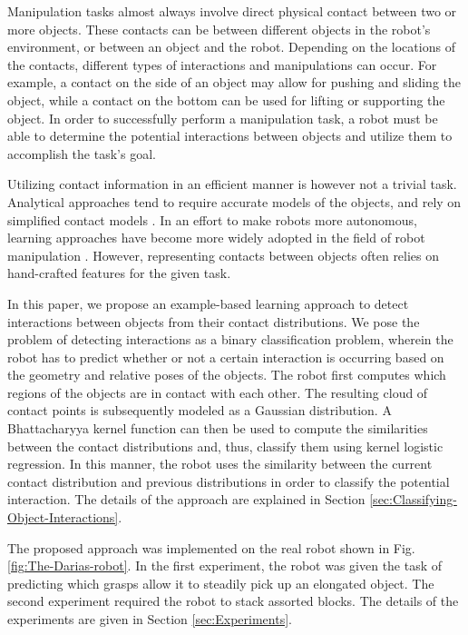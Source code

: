 Manipulation tasks almost always involve direct physical contact between
two or more objects. These contacts can be between different objects
in the robot's environment, or between an object and the robot. Depending
on the locations of the contacts, different types of interactions
and manipulations can occur. For example, a contact on the side of
an object may allow for pushing and sliding the object, while a contact
on the bottom can be used for lifting or supporting the object. In
order to successfully perform a manipulation task, a robot must be
able to determine the potential interactions between objects and utilize them
to accomplish the task's goal. 

Utilizing contact information in an efficient manner is however not
a trivial task. Analytical approaches tend to require accurate models
of the objects, and rely on simplified contact models \cite{GraspSurveyBohg}.
In an effort to make robots more autonomous, learning approaches have
become more widely adopted in the field of robot manipulation \cite{objectPlacementYun,KopickiZSMW11,SimulatedAffordanceLearning}.
However, representing contacts between objects often relies on hand-crafted
features for the given task. 

In this paper, we propose an example-based learning approach to detect
interactions between objects from their contact distributions. We
pose the problem of detecting interactions as a binary classification
problem, wherein the robot has to predict whether or not a certain
interaction is occurring based on the geometry and relative poses
of the objects. The robot first computes which regions of the objects
are in contact with each other. 
The resulting cloud of contact points
is subsequently modeled as a Gaussian distribution. A Bhattacharyya
kernel function \cite{JebaraK03} can then be used to compute the
similarities between the contact distributions and, thus, classify
them using kernel logistic regression. In this manner, the robot uses
the similarity between the current contact distribution and previous
distributions in order to classify the potential interaction. The
details of the approach are explained in Section \ref{sec:Classifying-Object-Interactions}.

The proposed approach was implemented on the real robot shown in Fig.
\ref{fig:The-Darias-robot}. In the first experiment, the robot was
given the task of predicting which grasps allow it to steadily pick
up an elongated object. The second experiment required the robot to
stack assorted blocks. The details of the experiments are given in
Section \ref{sec:Experiments}.


